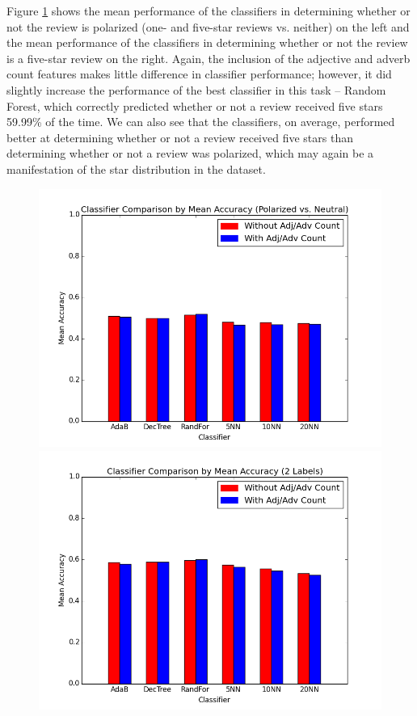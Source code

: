 Figure \ref{extremes} shows the mean performance of the classifiers in determining whether or not the review is polarized (one- and five-star reviews vs. neither) on the left and the mean performance of the classifiers in determining whether or not the review is a five-star review on the right. Again, the inclusion of the adjective and adverb count features makes little difference in classifier performance; however, it did slightly increase the performance of the best classifier in this task -- Random Forest, which correctly predicted whether or not a review received five stars 59.99\% of the time. We can also see that the classifiers, on average, performed better at determining whether or not a review received five stars than determining whether or not a review was polarized, which may again be a manifestation of the star distribution in the dataset.

\begin{figure}[!h]
\centering
\includegraphics[scale=0.38]{compexaccuracy}
\includegraphics[scale=0.38]{compbinaccuracy}
\caption{}
\label{extremes}
\end{figure}

